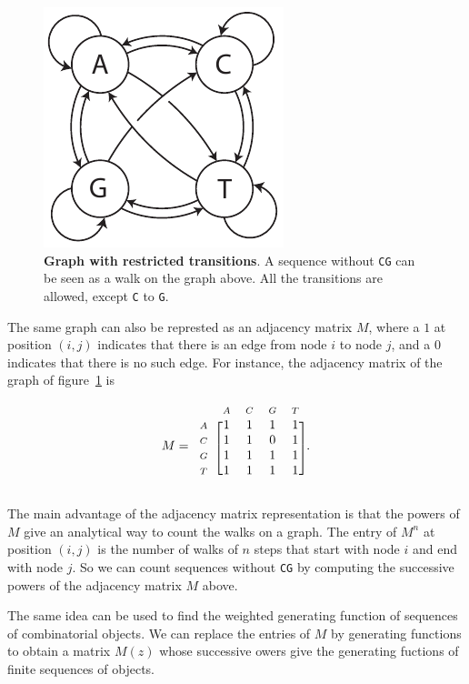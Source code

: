 \documentclass{article}
\newcommand{\smA}{\scriptstyle{A}}
\newcommand{\smC}{\scriptstyle{C}}
\newcommand{\smG}{\scriptstyle{G}}
\newcommand{\smT}{\scriptstyle{T}}
\begin{document}
\begin{figure}[h]
\centering
\includegraphics[scale=0.9]{CG_transitions.pdf}
\caption{\textbf{Graph with restricted transitions}.
A sequence without \texttt{CG} can be seen as a walk on the graph above.
All the transitions are allowed, except \texttt{C} to \texttt{G}.}
\label{fig:CG_transtions}
\end{figure}

The same graph can also be represted as an adjacency matrix $M$, where a
$1$ at position $(i,j)$ indicates that there is an edge from node $i$ to
node $j$, and a $0$ indicates that there is no such edge. For instance,
the adjacency matrix of the graph of figure~\ref{fig:CG_transtions} is

\begin{equation*}
M = 
\begin{blockarray}{ccccc}
     & \smA & \smC & \smG & \smT \\
\begin{block}{c[cccc]}
\smA & 1 & 1 & 1 & 1 \\
\smC & 1 & 1 & 0 & 1 \\
\smG & 1 & 1 & 1 & 1 \\
\smT & 1 & 1 & 1 & 1 \\
\end{block}
\end{blockarray}.
\end{equation*}

The main advantage of the adjacency matrix representation is that the
powers of $M$ give an analytical way to count the walks on a graph. The
entry of $M^n$ at position $(i,j)$ is the number of walks of $n$ steps
that start with node $i$ and end with node $j$. So we can count
sequences without \texttt{CG} by computing the successive powers of the
adjacency matrix $M$ above.

The same idea can be used to find the weighted generating function of
sequences of combinatorial objects. We can replace the entries of $M$ by
generating functions to obtain a matrix $M(z)$ whose successive owers give
the generating fuctions of finite sequences of objects.
\end{document}
